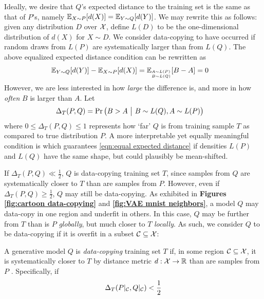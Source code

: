 Ideally, we desire that $Q$'s expected distance to the training set is the same as that of $P$'s, namely ${\mathbb E}_{X \sim P}[d(X)] = {\mathbb E}_{Y \sim Q}[d(Y)]$. We may rewrite this as follows: given any distribution $D$ over $\mathcal{X}$, define $L(D)$ to be the one-dimensional distribution of $d(X)$ for $X \sim D$. We consider data-copying to have occurred if random draws from $L(P)$ are systematically larger than from $L(Q)$. The above equalized expected distance condition can be rewritten as
\begin{align}
      {\mathbb E}_{Y \sim Q}[d(Y)] - {\mathbb E}_{X \sim P}[d(X)] 
      &= {\mathbb E}_{^{A \sim L(P)}_{B \sim L(Q)}}[B - A] 
      = 0
      \label{eqn:equal expected distance}
\end{align}
However, we are less interested in how \emph{large} the difference is, and more in how \emph{often} $B$ is larger than $A$. Let 
\begin{align*}
    \Delta_T(P,Q) &= {\mbox{\rm Pr}} \left( B > A \ \big|\  B \sim L(Q), A \sim L(P) \right)
\end{align*}
where $0 \leq \Delta_T(P,Q) \leq 1$ represents how `far' $Q$ is from training sample $T$ as compared to true distribution $P$. A more interpretable yet equally meaningful condition is
which guarantees \eqref{eqn:equal expected distance} if densities $L(P)$ and $L(Q)$ have the same shape, but could plausibly be mean-shifted. 

If $\Delta_T(P,Q) \ll \frac{1}{2}$, $Q$ is data-copying training set $T$, since samples from $Q$ are systematically closer to $T$ than are samples from $P$. However, even if $\Delta_T(P,Q) \geq \frac{1}{2}$, $Q$ may still be data-copying. As exhibited in \textbf{Figures \ref{fig:cartoon data-copying}} and \textbf{\ref{fig:VAE mnist neighbors}}, a model $Q$ may data-copy in one region and underfit in others. In this case, $Q$ may be further from $T$ than is $P$ \emph{globally}, but much closer to $T$ \emph{locally}. As such, we consider $Q$ to be data-copying if it is overfit in a subset $\mathcal{C} \subseteq \mathcal{X}$:

\begin{definition}
    A generative model $Q$ is \textit{data-copying} training set $T$ if, in some region $\mathcal{C} \subseteq \mathcal{X}$, it is systematically closer to $T$ by distance metric $d:\mathcal{X} \rightarrow {\mathbb R}$ than are samples from $P$ . Specifically, if
    \begin{align*}
        \Delta_T(P|_{\mathcal{C}}, Q|_{\mathcal{C}}) < \frac{1}{2}
    \end{align*}
\end{definition}

